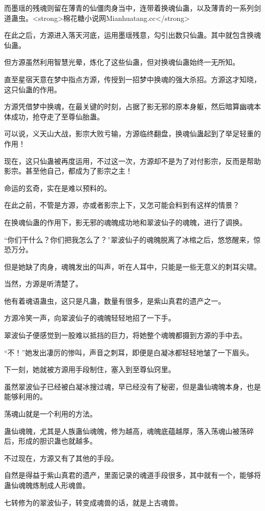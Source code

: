 \begin{this_body}
而墨瑶的残魂则留在薄青的仙僵肉身当中，连带着换魂仙蛊，以及薄青的一系列剑道蛊虫。<strong>棉花糖小说网Mianhuatang.cc</strong>

在此之后，方源进入落天河底，运用墨瑶残意，勾引出数只仙蛊。其中就包含换魂仙蛊。

但方源虽然利用智慧光晕，炼化了这些仙蛊，但对换魂仙蛊始终一无所知。

直至星宿天意在梦中指点方源，传授到一招梦中换魂的强大杀招。方源这才知晓，这只仙蛊的作用。

方源凭借梦中换魂，在最关键的时刻，占据了影无邪的原本身躯，然后暗算幽魂本体成功，抢夺走了至尊仙胎蛊。

可以说，义天山大战，影宗大败亏输，方源临终翻盘，换魂仙蛊起到了举足轻重的作用！

现在，这只仙蛊被再度运用，不过这一次，方源却不是为了对付影宗，反而是帮助影宗。甚至他自己，都成为了影宗之主！

命运的玄奇，实在是难以预料的。

在此之前，不管是方源，亦或者影宗上下，又怎可能会料到有这样的情景？

在换魂仙蛊的作用下，影无邪的魂魄成功地和翠波仙子的魂魄，进行了调换。

“你们干什么？你们把我怎么了？”翠波仙子的魂魄脱离了冰棺之后，悠悠醒来，惊恐万分。

但是她缺了肉身，魂魄发出的叫声，听在人耳中，只能是一些无意义的刺耳尖啸。

当然，方源是听清楚了。

他有着魂语蛊虫，这只是凡蛊，数量有很多，是紫山真君的遗产之一。

方源冷笑一声，向翠波仙子的魂魄轻轻地招了一下手。

翠波仙子便感觉到一股难以抵挡的巨力，将她整个魂魄都摄到方源的手中去。

“不！”她发出凄厉的惨叫，声音之刺耳，即便是白凝冰都轻轻地皱了一下眉头。

下一刻，她就被方源用手段制住，塞入到至尊仙窍里。

虽然翠波仙子已经被白凝冰搜过魂，早已经没有了秘密，但是蛊仙魂魄本身，也是能够利用的。

荡魂山就是一个利用的方法。

蛊仙魂魄，尤其是人族蛊仙魂魄，修为越高，魂魄底蕴越厚，落入荡魂山被荡碎后，形成的胆识蛊也就越多。

不过现在，方源又有了其他的手段。

自然是得益于紫山真君的遗产，里面记录的魂道手段很多，其中就有一个，能够将蛊仙魂魄炼制成人形魂兽。

七转修为的翠波仙子，转变成魂兽的话，就是上古魂兽。


\end{this_body}
